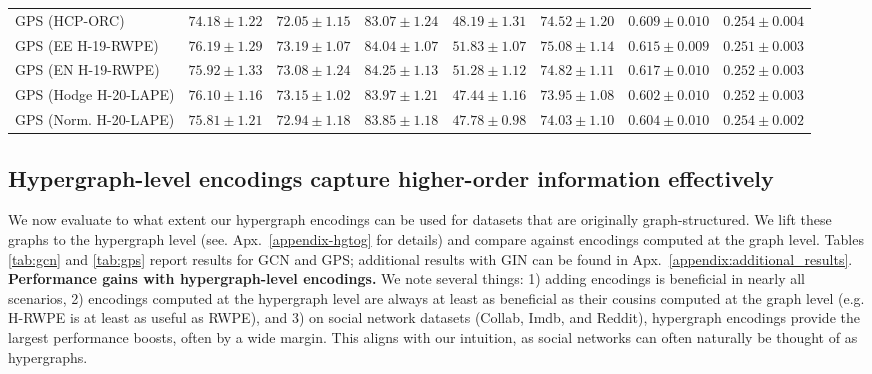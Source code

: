 \begin{table*}[ht!]
\begin{tabular}{|l|c|c|c|c|c|c|c|}
GPS (HCP-ORC) & $74.18 \pm 1.22$ & $72.05 \pm 1.15$ & $83.07 \pm 1.24$ & $48.19 \pm 1.31$ & $74.52 \pm 1.20$ & $0.609 \pm 0.010$ & $0.254 \pm 0.004$ \\
GPS (EE H-19-RWPE) & $\mathbf{76.19 \pm 1.29}$ & $\mathbf{73.19 \pm 1.07}$ & $84.04 \pm 1.07$ & $\mathbf{51.83 \pm 1.07}$ & $\mathbf{75.08 \pm 1.14}$ & $0.615 \pm 0.009$ & $\mathbf{0.251 \pm 0.003}$ \\
GPS (EN H-19-RWPE) & $75.92 \pm 1.33$ & $73.08 \pm 1.24$ & $\mathbf{84.25 \pm 1.13}$ & $51.28 \pm 1.12$ & $74.82 \pm 1.11$ & $\mathbf{0.617 \pm 0.010}$ & $0.252 \pm 0.003$ \\
GPS (Hodge H-20-LAPE) & $76.10 \pm 1.16$ & $73.15 \pm 1.02$ & $83.97 \pm 1.21$ & $47.44 \pm 1.16$ & $73.95 \pm 1.08$ & $0.602 \pm 0.010$ & $0.252 \pm 0.003$ \\
GPS (Norm. H-20-LAPE) & $75.81 \pm 1.21$ & $72.94 \pm 1.18$ & $83.85 \pm 1.18$ & $47.78 \pm 0.98$ & $74.03 \pm 1.10$ & $0.604 \pm 0.010$ & $0.254 \pm 0.002$ \\
\hline
\end{tabular}
\caption{GPS performance with graph level encodings (top) and hypergraph level encodings (bottom). We report mean and standard deviation across 50 runs.}
\label{tab:gps}
\end{table*}


\subsection{Hypergraph-level encodings capture higher-order information effectively }

We now evaluate to what extent our hypergraph encodings can be used for datasets that are originally graph-structured. We lift these graphs to the hypergraph level (see. Apx.~\ref{appendix-hgtog} for details) and compare against encodings computed at the graph level. Tables \ref{tab:gcn} and \ref{tab:gps} report results for GCN and GPS; additional results with GIN can be found in Apx.~\ref{appendix:additional_results}. \\

\noindent \textbf{Performance gains with hypergraph-level encodings.} We note several things: 1) adding encodings is beneficial in nearly all scenarios, 2) encodings computed at the hypergraph level are always at least as beneficial as their cousins computed at the graph level (e.g. H-RWPE is at least as useful as RWPE), and 3) on social network datasets (Collab, Imdb, and Reddit), hypergraph encodings provide the largest performance boosts, often by a wide margin. This aligns with our intuition, as social networks can often naturally be thought of as hypergraphs.\\

